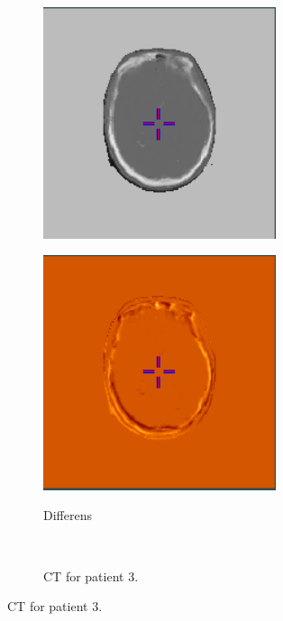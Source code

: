 \begin{figure}
\begin{subfigure}[b]{0.3\textwidth}
        \includegraphics[width=0.75\textwidth]{colager/loocv_ct/loocv_010769_sct.png}
        \label{col:loocv_ct_pat2_sct}
    \end{subfigure}\hfill
    \begin{subfigure}[b]{0.3\textwidth}
        \caption{Differens}
        \includegraphics[width=0.75\textwidth]{colager/loocv_ct/loocv_010769_sub.png}
        \label{col:loocv_ct_pat2_sub}
    \end{subfigure}\\
    \begin{subfigure}[b]{0.3\textwidth}
        \caption{CT for patient 3.}

\end{subfigure}
\end{figure}
